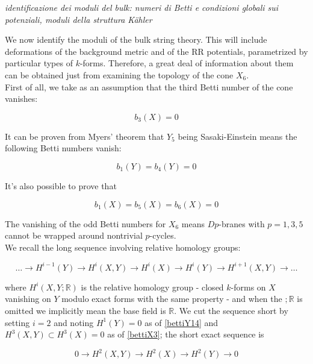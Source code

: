 \documentclass[11pt,a4paper,oneside,openright,titlepage]{book}
\newcommand{\cmmnt}[1]{\textcolor{Mahogany}{\emph{#1}}}
\begin{document}
\cmmnt{identificazione dei moduli del bulk: numeri di Betti e condizioni globali sui potenziali, moduli della struttura K\"ahler}

We now identify the moduli of the bulk string theory. This will include deformations of the background metric and of the RR potentials, parametrized by particular types of $k$-forms. Therefore, a great deal of information about them can be obtained just from examining the topology of the cone $X_6$.\\

First of all, we take as an assumption that the third Betti number of the cone vanishes:

\begin{equation}
	b_3(X) = 0 \label{bettiX3}
\end{equation}

It can be proven from Myers' theorem that $Y_5$ being Sasaki-Einstein means the following Betti numbers vanish:

\begin{equation}
	b_1(Y) = b_4(Y) = 0 \label{bettiY14}
\end{equation}

It's also possible to prove that

\begin{equation}
	b_1(X) = b_5(X) = b_6(X) = 0
\end{equation}

The vanishing of the odd Betti numbers for $X_6$ means $Dp$-branes with $p = 1,3,5$ cannot be wrapped around nontrivial $p$-cycles.\\

We recall the long sequence involving relative homology groups:

\begin{equation}
	\ldots \rightarrow H^{i-1}(Y) \rightarrow H^{i}(X,Y) \rightarrow H^i(X) \rightarrow H^i(Y) \rightarrow H^{i+1}(X,Y) \rightarrow \ldots
\end{equation}

where $H^i(X,Y;\mathbb{R})$ is the relative homology group - closed $k$-forms on $X$ vanishing on $Y$ modulo exact forms with the same property - and when the $;\mathbb{R}$ is omitted we implicitly mean the base field is $\mathbb{R}$. We cut the sequence short by setting $i=2$ and noting $H^1(Y) = 0$ as of \ref{bettiY14} and $H^3(X,Y) \subset H^3(X) = 0$ as of \ref{bettiX3}; the short exact sequence is

\begin{equation}
	0 \rightarrow H^2(X,Y) \rightarrow H^2(X) \rightarrow H^2(Y) \rightarrow 0
\end{equation}
\end{document}
